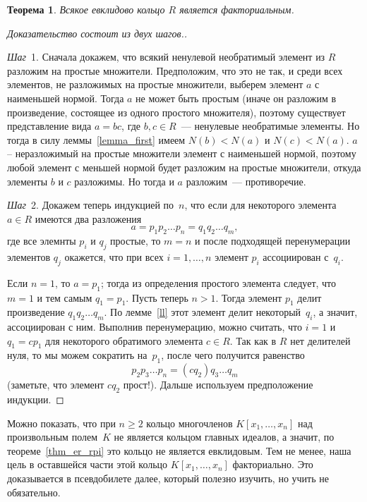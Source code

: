 \documentclass[a4paper, 12pt]{article}
\newtheorem{theorem}{Теорема}
\theoremstyle{definition}
\theoremstyle{remark}
\begin{document}
\begin{theorem} \label{thm_er_ufd}
Всякое евклидово кольцо $R$ является факториальным.
\end{theorem}

\begin{proof}[Доказательство \textup{состоит из двух шагов.}]~

\textit{Шаг}~1. Сначала докажем, что всякий ненулевой необратимый
элемент из $R$ разложим на простые множители. Предположим, что это
не так, и среди всех элементов, не разложимых на простые множители,
выберем элемент $a$ с наименьшей нормой. Тогда $a$ не может быть
простым (иначе он разложим в произведение, состоящее из одного
простого множителя), поэтому существует представление вида $a = bc$,
где $b,c \in R$~--- ненулевые необратимые элементы. Но тогда в силу
леммы~\ref{lemma_first} имеем $N(b) < N(a)$ и $N(c) < N(a)$. $a$ -- неразложимый на простые множители элемент с наименьшей нормой, поэтому любой элемент с меньшей нормой будет разложим на простые множители, откуда элементы $b$ и $c$ разложимы. Но тогда и $a$
разложим~--- противоречие.

\textit{Шаг}~2. Докажем теперь индукцией по~$n$, что если для
некоторого элемента $a \in R$ имеются два разложения
$$
a = p_1p_2\ldots p_n=q_1q_2\ldots q_m,
$$
где все элемнты $p_i$ и $q_j$ простые, то $m=n$ и после подходящей
перенумерации элементов $q_j$ окажется, что при всех $i = 1,\ldots,
n$ элемент $p_i$ ассоциирован с~$q_i$.

Если $n=1$, то $a = p_1$; тогда из определения простого элемента
следует, что $m = 1$ и тем самым $q_1 = p_1$. Пусть теперь $n > 1$.
Тогда элемент $p_1$ делит произведение $q_1 q_2 \ldots q_m$. По
лемме~\ref{ll} этот элемент делит некоторый~$q_i$, а значит,
ассоциирован с ним. Выполнив перенумерацию, можно считать, что $i =
1$ и $q_1 = cp_1$ для некоторого обратимого элемента $c \in R$. Так
как в $R$ нет делителей нуля, то мы можем сократить на~$p_1$, после
чего получится равенство
$$
p_2 p_3 \ldots p_n = (cq_2)q_3 \ldots q_m
$$
(заметьте, что элемент $cq_2$ прост!). Дальше используем
предположение индукции.
\end{proof}

Можно показать, что при $n
\geqslant 2$ кольцо многочленов $K[x_1, \ldots, x_n]$ над
произвольным полем~$K$ не является кольцом главных идеалов, а
значит, по теореме~\ref{thm_er_rpi} это кольцо не является
евклидовым. Тем не менее, наша цель в оставшейся части этой кольцо $K[x_1, \ldots, x_n]$ факториально. Это доказывается в псевдобилете далее, который полезно изучить, но учить не обязательно.
\end{document}
